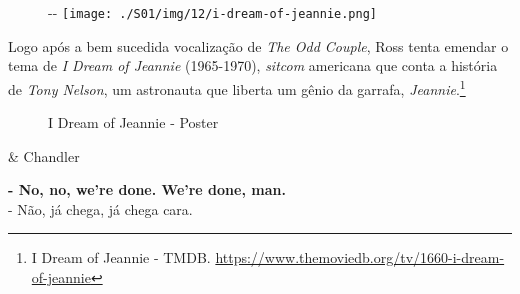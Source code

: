 \begin{figure}[!ht]
  \begin{adjustwidth}{-\oddsidemargin-1in}{-\rightmargin}
    \centering
    \texttt{[image: ./S01/img/12/i-dream-of-jeannie.png]}
  \end{adjustwidth}
\end{figure}

\saveparinfos
\noindent
\begin{minipage}[c]{0.5\textwidth}\useparinfo

Logo após a bem sucedida vocalização de \emph{The Odd Couple}, Ross
tenta emendar o tema de \emph{I Dream of Jeannie} (1965-1970),
\emph{sitcom} americana que conta a história de \emph{Tony Nelson}, um
astronauta que liberta um gênio da garrafa, \emph{Jeannie}.\footnote{\sloppy I Dream of Jeannie - TMDB. \url{https://www.themoviedb.org/tv/1660-i-dream-of-jeannie}}

\end{minipage}\hfill
\begin{minipage}[c]{0.5\textwidth}

\begin{figure}
  \centering
    \caption{I Dream of Jeannie - Poster\label{fig:i-dream-of-jeannie-poster}}
\end{figure}

\end{minipage}

\begin{tcolorbox}[enhanced,center upper,
    drop fuzzy shadow southeast, boxrule=0.3pt,
    lower separated=false, breakable,
    colframe=black!30!dialogoBorder,colback=white]
\begin{minipage}[c]{0.16\linewidth}
   & \centering \scriptsize{Chandler}
\end{minipage}
\hfill
\begin{minipage}[c]{0.8\linewidth}
  \textbf{- No, no, we're done. We're done, man.}\\
  - Não, já chega, já chega cara.
\end{minipage}
\end{tcolorbox}

